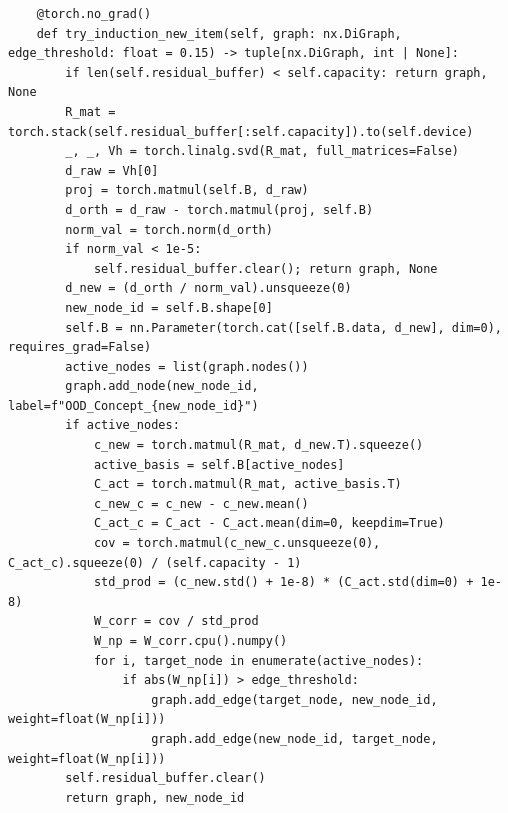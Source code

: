 \documentclass[11pt,a4paper]{article}
\begin{document}
\begin{lstlisting}
    @torch.no_grad()
    def try_induction_new_item(self, graph: nx.DiGraph, edge_threshold: float = 0.15) -> tuple[nx.DiGraph, int | None]:
        if len(self.residual_buffer) < self.capacity: return graph, None
        R_mat = torch.stack(self.residual_buffer[:self.capacity]).to(self.device)
        _, _, Vh = torch.linalg.svd(R_mat, full_matrices=False)
        d_raw = Vh[0]
        proj = torch.matmul(self.B, d_raw)
        d_orth = d_raw - torch.matmul(proj, self.B)
        norm_val = torch.norm(d_orth)
        if norm_val < 1e-5:
            self.residual_buffer.clear(); return graph, None
        d_new = (d_orth / norm_val).unsqueeze(0)
        new_node_id = self.B.shape[0]
        self.B = nn.Parameter(torch.cat([self.B.data, d_new], dim=0), requires_grad=False)
        active_nodes = list(graph.nodes())
        graph.add_node(new_node_id, label=f"OOD_Concept_{new_node_id}")
        if active_nodes:
            c_new = torch.matmul(R_mat, d_new.T).squeeze()
            active_basis = self.B[active_nodes]
            C_act = torch.matmul(R_mat, active_basis.T)
            c_new_c = c_new - c_new.mean()
            C_act_c = C_act - C_act.mean(dim=0, keepdim=True)
            cov = torch.matmul(c_new_c.unsqueeze(0), C_act_c).squeeze(0) / (self.capacity - 1)
            std_prod = (c_new.std() + 1e-8) * (C_act.std(dim=0) + 1e-8)
            W_corr = cov / std_prod
            W_np = W_corr.cpu().numpy()
            for i, target_node in enumerate(active_nodes):
                if abs(W_np[i]) > edge_threshold:
                    graph.add_edge(target_node, new_node_id, weight=float(W_np[i]))
                    graph.add_edge(new_node_id, target_node, weight=float(W_np[i]))
        self.residual_buffer.clear()
        return graph, new_node_id
\end{lstlisting}
\end{document}
